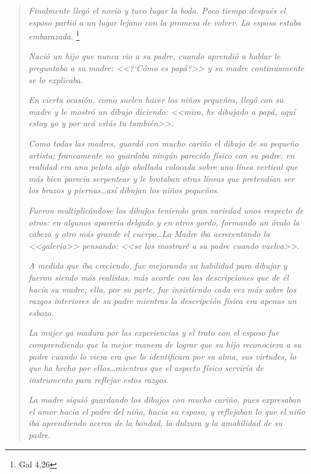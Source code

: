 \documentclass{article}
\begin{document}
\begin{quote}
\emph{Finalmente lleg\'o el novio y tuvo lugar la boda. Poco tiempo despu\'es el esposo parti\'o a un lugar lejano con la promesa de volver. La esposa estaba embarazada.}%
    \footnote{Gal 4,26}
    
\emph{Naci\'o un hijo que nunca vio a su padre, cuando aprendi\'o a hablar le preguntaba a su madre: <<?`C\'omo es pap\'a?>> y su madre continuamente se lo explicaba.}

\emph{En cierta ocasi\'on, como suelen hacer los ni\~nos peque\~nos, lleg\'o con su madre y le mostr\'o un dibujo diciendo: <<mira, he dibujado a pap\'a, aqu\'{i} estoy yo y por ac\'a est\'as tu tambi\'en>>.}

\emph{Como todas las madres, guard\'o con mucho cari\~no el dibujo de su peque\~no artista; francamente no guardaba ning\'un parecido f\'{i}sico con su padre: en realidad era una pelota algo abollada colocada sobre una l\'{i}nea vertical que m\'as bien parec\'{i}a serpentear y le brotaban otras l\'{i}neas que pretend\'{i}an ser los brazos y piernas\ldots as\'{i} dibujan los ni\~nos peque\~nos.}

\emph{Fueron multiplic\'andose los dibujos teniendo gran variedad unos respecto de otros: en algunos aparec\'{i}a delgado y en otros gordo, formando un \'ovalo la cabeza y otro m\'as grande el cuerpo\ldots La Madre iba acrecentando la <<galer\'{i}a>> pensando: <<se los mostrar\'e a su padre cuando vuelva>>.}

\emph{A medida que iba creciendo, fue mejorando su habilidad para dibujar y fueron siendo m\'as realistas, m\'as acorde con las descripciones que de \'el hac\'{i}a su madre; ella, por su parte, fue insistiendo cada vez m\'as sobre los razgos interiores de su padre mientras la descripci\'on f\'{i}sica era apenas un esbozo.}

\emph{La mujer ya madura por las experiencias y el trato con el esposo fue comprendiendo que la mejor manera de lograr que su hijo reconociera a su padre cuando lo viera era que lo identificara por su alma, sus virtudes, lo que ha hecho por ellos\ldots mientras que el aspecto f\'{i}sico servir\'{i}a de instrumento para reflejar estos razgos.}

\emph{La madre sigui\'o guardando los dibujos con mucho cari\~no, pues expresaban el amor hacia el padre del ni\~no, hacia su esposo, y reflejaban lo que el ni\~no iba aprendiendo acerca de la bondad, la dulzura y la amabilidad de su padre.}
\end{quote}
\end{document}
